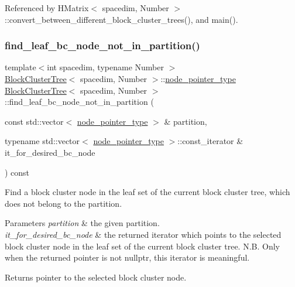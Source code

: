 Referenced by H\+Matrix$<$ spacedim, Number $>$\+::convert\+\_\+between\+\_\+different\+\_\+block\+\_\+cluster\+\_\+trees(), and main().

\mbox{\label{classBlockClusterTree_a4782e1e817b6e6265bff43baf2b1dbaa}} 
\subsubsection{\texorpdfstring{find\+\_\+leaf\+\_\+bc\+\_\+node\+\_\+not\+\_\+in\+\_\+partition()}{find\_leaf\_bc\_node\_not\_in\_partition()}}
{\footnotesize\ttfamily template$<$int spacedim, typename Number $>$ \\
\hyperlink{classBlockClusterTree}{Block\+Cluster\+Tree}$<$ spacedim, Number $>$\+::\hyperlink{classTreeNode}{node\+\_\+pointer\+\_\+type} \hyperlink{classBlockClusterTree}{Block\+Cluster\+Tree}$<$ spacedim, Number $>$\+::find\+\_\+leaf\+\_\+bc\+\_\+node\+\_\+not\+\_\+in\+\_\+partition (\begin{DoxyParamCaption}\item[{const std\+::vector$<$ \hyperlink{classTreeNode}{node\+\_\+pointer\+\_\+type} $>$ \&}]{partition,  }\item[{typename std\+::vector$<$ \hyperlink{classTreeNode}{node\+\_\+pointer\+\_\+type} $>$\+::const\+\_\+iterator \&}]{it\+\_\+for\+\_\+desired\+\_\+bc\+\_\+node }\end{DoxyParamCaption}) const\hspace{0.3cm}{\ttfamily [private]}}

Find a block cluster node in the leaf set of the current block cluster tree, which does not belong to the partition. 
\begin{DoxyParams}{Parameters}
{\em partition} & the given partition. \\
\hline
{\em it\+\_\+for\+\_\+desired\+\_\+bc\+\_\+node} & the returned iterator which points to the selected block cluster node in the leaf set of the current block cluster tree. N.\+B. Only when the returned pointer is not {\ttfamily nullptr}, this iterator is meaningful. \\
\hline
\end{DoxyParams}
\begin{DoxyReturn}{Returns}
pointer to the selected block cluster node. 
\end{DoxyReturn}

